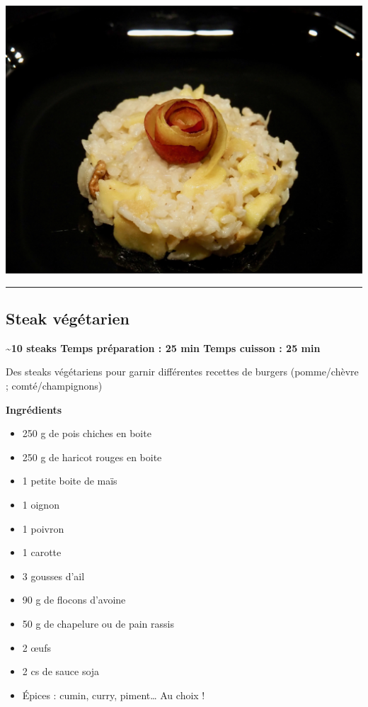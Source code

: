 \documentclass[]{book}
\providecommand{\tightlist}{%
  \setlength{\itemsep}{0pt}\setlength{\parskip}{0pt}}
\begin{document}
\begin{center}\includegraphics[width=0.9\linewidth]{photos/risotto-gorgonzola} \end{center}

\begin{center}\rule{0.5\linewidth}{0.5pt}\end{center}

\subsection*{\texorpdfstring{{Steak
végétarien}}{Steak végétarien}}\label{steak-vuxe9guxe9tarien}

\begin{salebox}
\textbf{\textasciitilde{}10 steaks \textbar{} Temps préparation : 25 min
\textbar{} Temps cuisson : 25 min}

Des steaks végétariens pour garnir différentes recettes de burgers
(pomme/chèvre ; comté/champignons)
\end{salebox}

 \textbf{Ingrédients}

\begin{itemize}
\tightlist
\item
  250 g de pois chiches en boite
\item
  250 g de haricot rouges en boite
\item
  1 petite boite de maïs
\item
  1 oignon
\item
  1 poivron
\item
  1 carotte
\item
  3 gousses d'ail
\item
  90 g de flocons d'avoine
\item
  50 g de chapelure ou de pain rassis
\item
  2 œufs
\item
  2 cs de sauce soja
\item
  Épices : cumin, curry, piment\ldots{} Au choix !
\end{itemize}
\end{document}
